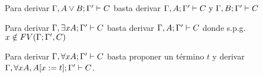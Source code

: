 \documentclass[11pt,letterpaper]{article}
\begin{document}
\item Para derivar $\Gamma,A\lor B;\Gamma'\vdash C$ basta derivar
$\Gamma,A;\Gamma'\vdash C\text{ y }\Gamma,B;\Gamma'\vdash C $

\item Para derivar $\Gamma,\exists x A;\Gamma'\vdash C$ basta derivar 
$ \Gamma,A;\Gamma'\vdash C$ donde s.p.g. $x\notin FV(\Gamma;\Gamma',C)$
\item Para derivar $\Gamma,\forall x A;\Gamma'\vdash C$ basta proponer un término $t$ y derivar 
$\Gamma,\forall x A, A[x:=t];\Gamma'\vdash C$.

\ei





\end{document}
